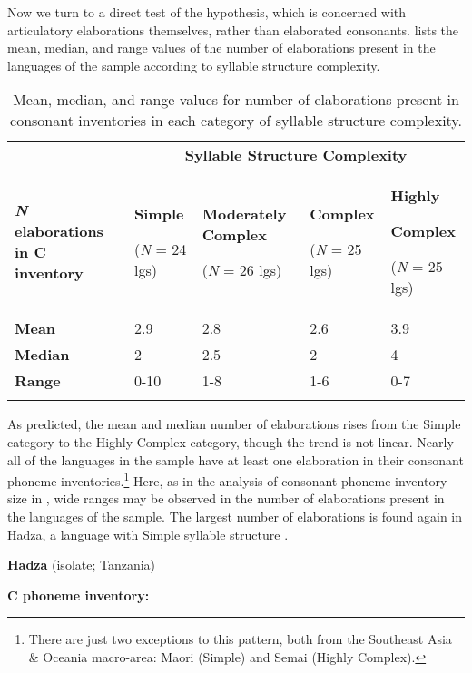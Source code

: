   Now we turn to a direct test of the hypothesis, which is concerned with articulatory elaborations themselves, rather than elaborated consonants.  lists the mean, median, and range values of the number of elaborations present in the languages of the sample according to syllable structure complexity.

\begin{table}
\begin{tabularx}{\textwidth}{XXXXX}
 & \multicolumn{4}{c}{ \textbf{Syllable Structure Complexity}}\\
\lsptoprule
\textbf{\textit{N}} \textbf{elaborations in C inventory} & { \textbf{Simple}}

 (\textit{N} = 24 lgs) & { \textbf{Moderately Complex}}

 (\textit{N} = 26 lgs) & { \textbf{Complex}}

 (\textit{N} = 25 lgs) & { \textbf{Highly} }

{ \textbf{Complex}}

 (\textit{N} = 25 lgs)\\
\textbf{Mean} & 2.9 & 2.8 & 2.6 & 3.9\\
\textbf{Median} & 2 & 2.5 & 2 & 4\\
\textbf{Range} & 0-10 & 1-8 & 1-6 & 0-7\\
\lspbottomrule
\end{tabularx}
\caption{\label{tab:4.11}Mean, median, and range values for number of elaborations present in consonant inventories in each category of syllable structure complexity.}
\end{table}

  As predicted, the mean and median number of elaborations rises from the Simple category to the Highly Complex category, though the trend is not linear. Nearly all of the languages in the sample have at least one elaboration in their consonant phoneme inventories.\footnote{{There are just two exceptions to this pattern, both from the Southeast Asia \& Oceania macro-area: Maori (Simple) and Semai (Highly Complex).} } Here, as in the analysis of consonant phoneme inventory size in , wide ranges may be observed in the number of elaborations present in the languages of the sample. The largest number of elaborations is found again in Hadza, a language with Simple syllable structure .

\ea\label{ex:4.27}
  \textbf{Hadza} (isolate; Tanzania)

\textbf{C phoneme inventory:} 

